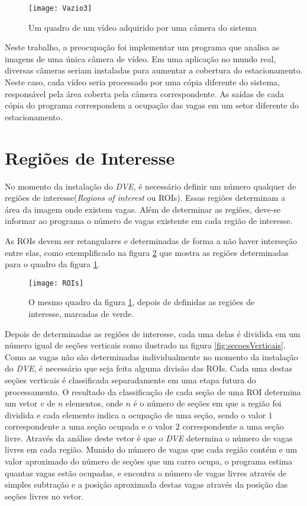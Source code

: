 \begin{figure}[!ht]
	\centering
	\texttt{[image: Vazio3]}
	\label{fig:aquisicao}
	\caption{Um quadro de um vídeo adquirido por uma câmera do sistema}
	\centering
\end{figure}

Neste trabalho, a preocupação foi implementar um programa que analisa as imagens de uma única câmera de vídeo. Em uma aplicação no mundo real, diversas câmeras seriam instaladas para aumentar a cobertura do estacionamento. Neste caso, cada vídeo seria processado por uma cópia diferente do sistema, responsável pela área coberta pela câmera correspondente. As saídas de cada cópia do programa correspondem a ocupação das vagas em um setor diferente do estacionamento.

\section{Regiões de Interesse}\label{sec:ROIs}

No momento da instalação do \textit{DVE}, é necessário definir um número qualquer de regiões de interesse(\textit{Regions of interest} ou ROIs). Essas regiões determinam a área da imagem onde existem vagas. Além de determinar as regiões, deve-se informar ao programa o número de vagas existente em cada região de interesse.

As ROIs devem ser retangulares e determinadas de forma a não haver interseção entre elas, como exemplificado na figura \ref{fig:ROIs} que mostra as regiões determinadas para o quadro da figura \ref{fig:aquisicao}.

\begin{figure}
	\centering
	\texttt{[image: ROIs]}
	\label{fig:ROIs}
	\caption{O mesmo quadro da figura \ref{fig:aquisicao}, depois de definidas as regiões de interesse, marcadas de verde.}
	\centering
\end{figure}

Depois de determinadas as regiões de interesse, cada uma delas é dividida em um número igual de seções verticais como ilustrado na figura \ref{fig:secoesVerticais}. Como as vagas não são determinadas individualmente no momento da instalação do \textit{DVE}, é necessário que seja feita alguma divisão das ROIs. Cada uma destas seções verticais é classificada separadamente em uma etapa futura do processamento. O resultado da classificação de cada seção de uma ROI determina um vetor $v$ de $n$ elementos, onde $n$ é o número de seções em que a região foi dividida e cada elemento indica a ocupação de uma seção, sendo o valor $1$ correspondente a uma seção ocupada e o valor $2$ correspondente a uma seção livre. Através da análise deste vetor é que o \textit{DVE} determina o número de vagas livres em cada região. Munido do número de vagas que cada região contém e um valor aproximado do número de seções que um carro ocupa, o programa estima quantas vagas estão ocupadas, e encontra o número de vagas livres através de simples subtração e a posição aproximada destas vagas através da posição das seções livres no vetor.

